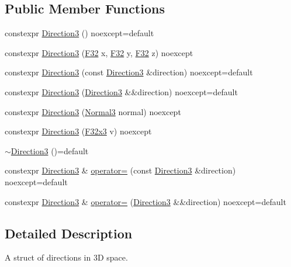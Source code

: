 \subsection*{Public Member Functions}
\begin{DoxyCompactItemize}
\item 
constexpr \hyperlink{structmage_1_1_direction3_a64dd4745147f5fd39f710e8b9591074a}{Direction3} () noexcept=default
\item 
constexpr \hyperlink{structmage_1_1_direction3_a880d7413dc6f3742b53a089b870018c7}{Direction3} (\hyperlink{namespacemage_aa97e833b45f06d60a0a9c4fc22ae02c0}{F32} x, \hyperlink{namespacemage_aa97e833b45f06d60a0a9c4fc22ae02c0}{F32} y, \hyperlink{namespacemage_aa97e833b45f06d60a0a9c4fc22ae02c0}{F32} z) noexcept
\item 
constexpr \hyperlink{structmage_1_1_direction3_ad4d5801c6ad4949e0c7b0f4e2fec0ed9}{Direction3} (const \hyperlink{structmage_1_1_direction3}{Direction3} \&direction) noexcept=default
\item 
constexpr \hyperlink{structmage_1_1_direction3_aff1506b32f2b6dd49c2747eca90c76ce}{Direction3} (\hyperlink{structmage_1_1_direction3}{Direction3} \&\&direction) noexcept=default
\item 
constexpr \hyperlink{structmage_1_1_direction3_a180b7a9f58b37403d0be5b70519eafec}{Direction3} (\hyperlink{structmage_1_1_normal3}{Normal3} normal) noexcept
\item 
constexpr \hyperlink{structmage_1_1_direction3_a9ef3fe2fd9fd55fade378d42eda597c3}{Direction3} (\hyperlink{namespacemage_a73fbe0da4b8d5bc156bb8453e5b63a17}{F32x3} v) noexcept
\item 
\hyperlink{structmage_1_1_direction3_a583c087dc366d206aaf54a33bc90c50b}{$\sim$\+Direction3} ()=default
\item 
constexpr \hyperlink{structmage_1_1_direction3}{Direction3} \& \hyperlink{structmage_1_1_direction3_a500a363a93cded3e36a0704d288d34f3}{operator=} (const \hyperlink{structmage_1_1_direction3}{Direction3} \&direction) noexcept=default
\item 
constexpr \hyperlink{structmage_1_1_direction3}{Direction3} \& \hyperlink{structmage_1_1_direction3_a111a8f8d7286bfba0d7586925666315b}{operator=} (\hyperlink{structmage_1_1_direction3}{Direction3} \&\&direction) noexcept=default
\end{DoxyCompactItemize}


\subsection{Detailed Description}
A struct of directions in 3D space. 


